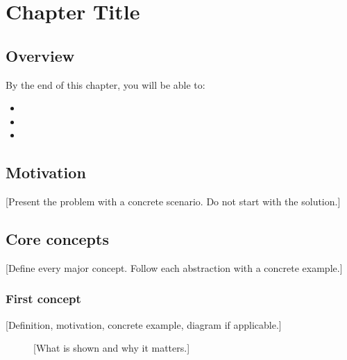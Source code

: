 
\chapter{Chapter Title}
\label{ch:chapter-label}

\section{Overview}
\label{sec:chapter-label-overview}


By the end of this chapter, you will be able to:
\begin{itemize}
  \item [Skill 1]
  \item [Skill 2]
  \item [Skill 3]
\end{itemize}

\section{Motivation}
\label{sec:chapter-label-motivation}

[Present the problem with a concrete scenario. Do not start with the solution.]

\section{Core concepts}
\label{sec:chapter-label-concepts}

[Define every major concept. Follow each abstraction with a concrete example.]

\subsection{First concept}
\label{subsec:chapter-label-concept1}

[Definition, motivation, concrete example, diagram if applicable.]

\begin{figure}[H]
  \centering
  
  \caption{[What is shown and why it matters.]}
  \label{fig:chapter-label-concept1}
\end{figure}

